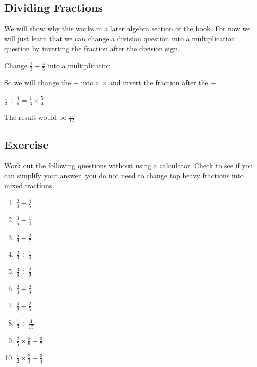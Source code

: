 \subsection{Dividing Fractions}
We will show why this works in a later algebra section of the book.  For now we will just learn that we can change a division question into a multiplication question by inverting the fraction after the division sign.

\begin{exmp}
Change $\displaystyle \frac{1}{3} \div \frac{4}{5}$ into a multiplication.

\bigskip

So we will change the $\div$ into a $\times$ and invert the fraction after the $\div$

\bigskip

$\displaystyle \frac{1}{3} \div \frac{4}{5} = \frac{1}{3} \times \frac{5}{4}$

\bigskip

The result would be $\displaystyle \frac{5}{12}$
\end{exmp}

\subsection{Exercise}
Work out the following questions without using a calculator.  Check to see if you can simplify your answer, you do not need to change top heavy fractions into mixed fractions.
\begin{multicols}{2}
\begin{enumerate}
	\item $\displaystyle \frac{2}{3} \div \frac{4}{5}$
	\item $\displaystyle \frac{3}{5} \div \frac{1}{4}$
	\item $\displaystyle \frac{5}{9} \div \frac{2}{7}$
	\item $\displaystyle \frac{2}{3} \div \frac{1}{4}$
	\item $\displaystyle \frac{3}{8} \div \frac{2}{9}$
	\item $\displaystyle \frac{2}{3} \div \frac{2}{3}$
	\item $\displaystyle \frac{4}{9} \div \frac{2}{5}$
	\item $\displaystyle \frac{1}{3} \div \frac{4}{15}$
	\item $\displaystyle \frac{2}{5} \times \frac{5}{6} \div \frac{3}{7}$
	\item $\displaystyle \frac{1}{2} \times \frac{2}{3} \div \frac{3}{4}$
\end{enumerate}
\end{multicols}

